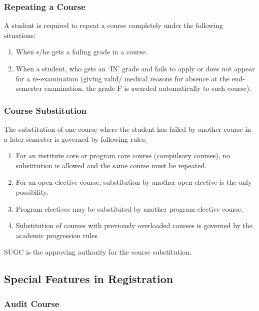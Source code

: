 \subsubsection{Repeating a Course}

A student is required to repeat a course completely under the following situations: 

\begin{enumerate}
    \item When s/he gets a failing grade in a course. 
    \item When a student, who gets an ‘IN' grade and fails to apply or does not appear for a re-examination (giving valid/ medical reasons for absence at the end-semester examination, the grade F is awarded automatically to such course).
\end{enumerate}

\subsubsection{Course Substitution}

The substitution of one course where the student has failed by another course in a later semester is governed by following rules.

\begin{enumerate}
    \item For an institute core or program core course (compulsory courses), no substitution is allowed and the same course must be repeated. 
    \item For an open elective course, substitution by another open elective is the only possibility. 
    \item Program electives may be substituted by another program elective course.
    \item Substitution of courses with previously overloaded courses is governed by the academic progression rules.
\end{enumerate}

SUGC is the approving authority for the course substitution.

\subsection{Special Features in Registration}

\subsubsection{Audit Course}

